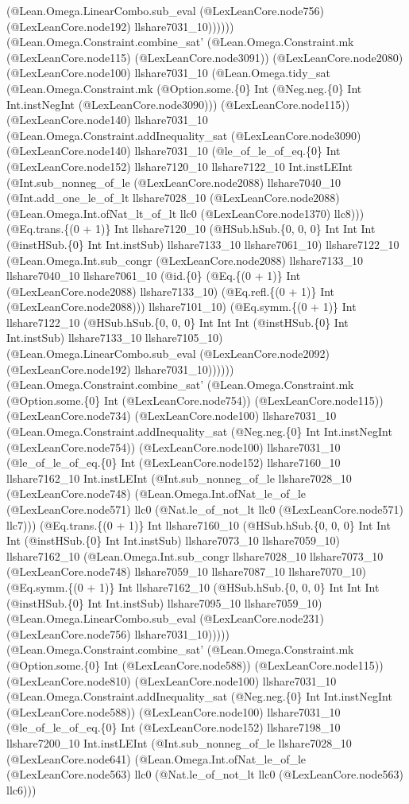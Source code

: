 \documentclass[11pt]{article}
\begin{document}
(@Lean.Omega.LinearCombo.sub\_eval (@LexLeanCore.node756) (@LexLeanCore.node192) llshare7031\_10)))))) (@Lean.Omega.Constraint.combine\_sat' (@Lean.Omega.Constraint.mk (@LexLeanCore.node115) (@LexLeanCore.node3091)) (@LexLeanCore.node2080) (@LexLeanCore.node100) llshare7031\_10 (@Lean.Omega.tidy\_sat (@Lean.Omega.Constraint.mk (@Option.some.\{0\} Int (@Neg.neg.\{0\} Int Int.instNegInt (@LexLeanCore.node3090))) (@LexLeanCore.node115)) (@LexLeanCore.node140) llshare7031\_10 (@Lean.Omega.Constraint.addInequality\_sat (@LexLeanCore.node3090) (@LexLeanCore.node140) llshare7031\_10 (@le\_of\_le\_of\_eq.\{0\} Int (@LexLeanCore.node152) llshare7120\_10 llshare7122\_10 Int.instLEInt (@Int.sub\_nonneg\_of\_le (@LexLeanCore.node2088) llshare7040\_10 (@Int.add\_one\_le\_of\_lt llshare7028\_10 (@LexLeanCore.node2088) (@Lean.Omega.Int.ofNat\_lt\_of\_lt llc0 (@LexLeanCore.node1370) llc8))) (@Eq.trans.\{(0 + 1)\} Int llshare7120\_10 (@HSub.hSub.\{0, 0, 0\} Int Int Int (@instHSub.\{0\} Int Int.instSub) llshare7133\_10 llshare7061\_10) llshare7122\_10 (@Lean.Omega.Int.sub\_congr (@LexLeanCore.node2088) llshare7133\_10 llshare7040\_10 llshare7061\_10 (@id.\{0\} (@Eq.\{(0 + 1)\} Int (@LexLeanCore.node2088) llshare7133\_10) (@Eq.refl.\{(0 + 1)\} Int (@LexLeanCore.node2088))) llshare7101\_10) (@Eq.symm.\{(0 + 1)\} Int llshare7122\_10 (@HSub.hSub.\{0, 0, 0\} Int Int Int (@instHSub.\{0\} Int Int.instSub) llshare7133\_10 llshare7105\_10) (@Lean.Omega.LinearCombo.sub\_eval (@LexLeanCore.node2092) (@LexLeanCore.node192) llshare7031\_10)))))) (@Lean.Omega.Constraint.combine\_sat' (@Lean.Omega.Constraint.mk (@Option.some.\{0\} Int (@LexLeanCore.node754)) (@LexLeanCore.node115)) (@LexLeanCore.node734) (@LexLeanCore.node100) llshare7031\_10 (@Lean.Omega.Constraint.addInequality\_sat (@Neg.neg.\{0\} Int Int.instNegInt (@LexLeanCore.node754)) (@LexLeanCore.node100) llshare7031\_10 (@le\_of\_le\_of\_eq.\{0\} Int (@LexLeanCore.node152) llshare7160\_10 llshare7162\_10 Int.instLEInt (@Int.sub\_nonneg\_of\_le llshare7028\_10 (@LexLeanCore.node748) (@Lean.Omega.Int.ofNat\_le\_of\_le (@LexLeanCore.node571) llc0 (@Nat.le\_of\_not\_lt llc0 (@LexLeanCore.node571) llc7))) (@Eq.trans.\{(0 + 1)\} Int llshare7160\_10 (@HSub.hSub.\{0, 0, 0\} Int Int Int (@instHSub.\{0\} Int Int.instSub) llshare7073\_10 llshare7059\_10) llshare7162\_10 (@Lean.Omega.Int.sub\_congr llshare7028\_10 llshare7073\_10 (@LexLeanCore.node748) llshare7059\_10 llshare7087\_10 llshare7070\_10) (@Eq.symm.\{(0 + 1)\} Int llshare7162\_10 (@HSub.hSub.\{0, 0, 0\} Int Int Int (@instHSub.\{0\} Int Int.instSub) llshare7095\_10 llshare7059\_10) (@Lean.Omega.LinearCombo.sub\_eval (@LexLeanCore.node231) (@LexLeanCore.node756) llshare7031\_10))))) (@Lean.Omega.Constraint.combine\_sat' (@Lean.Omega.Constraint.mk (@Option.some.\{0\} Int (@LexLeanCore.node588)) (@LexLeanCore.node115)) (@LexLeanCore.node810) (@LexLeanCore.node100) llshare7031\_10 (@Lean.Omega.Constraint.addInequality\_sat (@Neg.neg.\{0\} Int Int.instNegInt (@LexLeanCore.node588)) (@LexLeanCore.node100) llshare7031\_10 (@le\_of\_le\_of\_eq.\{0\} Int (@LexLeanCore.node152) llshare7198\_10 llshare7200\_10 Int.instLEInt (@Int.sub\_nonneg\_of\_le llshare7028\_10 (@LexLeanCore.node641) (@Lean.Omega.Int.ofNat\_le\_of\_le (@LexLeanCore.node563) llc0 (@Nat.le\_of\_not\_lt llc0 (@LexLeanCore.node563) llc6))) 
\end{document}
